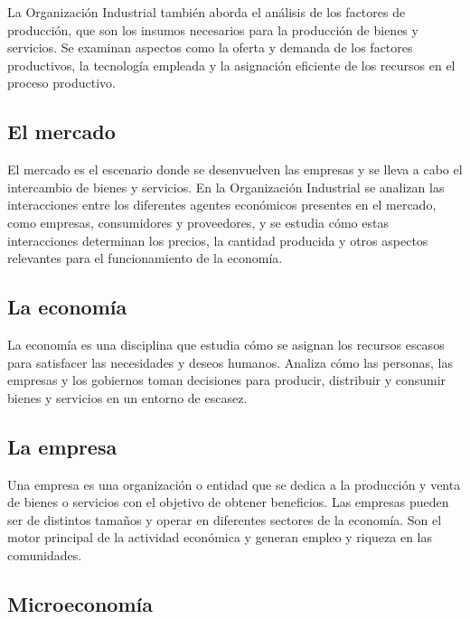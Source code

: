 \documentclass[
  a4paper,
]{article}
\begin{document}
La Organización Industrial también aborda el análisis de los factores de
producción, que son los insumos necesarios para la producción de bienes
y servicios. Se examinan aspectos como la oferta y demanda de los
factores productivos, la tecnología empleada y la asignación eficiente
de los recursos en el proceso productivo.

\hypertarget{el-mercado}{%
\subsection{El mercado}\label{el-mercado}}

El mercado es el escenario donde se desenvuelven las empresas y se lleva
a cabo el intercambio de bienes y servicios. En la Organización
Industrial se analizan las interacciones entre los diferentes agentes
económicos presentes en el mercado, como empresas, consumidores y
proveedores, y se estudia cómo estas interacciones determinan los
precios, la cantidad producida y otros aspectos relevantes para el
funcionamiento de la economía.

\hypertarget{la-economuxeda}{%
\subsection{La economía}\label{la-economuxeda}}

La economía es una disciplina que estudia cómo se asignan los recursos
escasos para satisfacer las necesidades y deseos humanos. Analiza cómo
las personas, las empresas y los gobiernos toman decisiones para
producir, distribuir y consumir bienes y servicios en un entorno de
escasez.

\hypertarget{la-empresa}{%
\subsection{La empresa}\label{la-empresa}}

Una empresa es una organización o entidad que se dedica a la producción
y venta de bienes o servicios con el objetivo de obtener beneficios. Las
empresas pueden ser de distintos tamaños y operar en diferentes sectores
de la economía. Son el motor principal de la actividad económica y
generan empleo y riqueza en las comunidades.

\hypertarget{microeconomuxeda}{%
\subsection{Microeconomía}\label{microeconomuxeda}}
\end{document}
